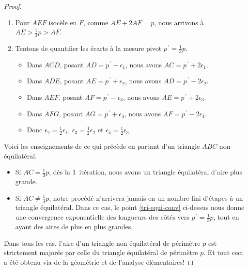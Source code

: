 \begin{proof}
\begin{enumerate}
		\item Pour $AEF$ isocèle en $F$, comme $AE + 2AF = p$, nous arrivons à  $AE > \frac13 p > AF$.
		
		
		\item \label{tri-equi-conv}
		Tentons de quantifier les écarts à la mesure pivot $p^{\,\prime} = \frac13 p$. 
		\begin{itemize}
			\item Dans $ACD$, posant $AD = p^{\,\prime} - \epsilon_1$, nous avons $AC = p^{\,\prime} + 2 \epsilon_1$.

			\item Dans $ADE$, posant $AE = p^{\,\prime} + \epsilon_2$, nous avons $AD = p^{\,\prime} - 2 \epsilon_2$.

			\item Dans $AEF$, posant $AF = p^{\,\prime} - \epsilon_3$, nous avons $AE = p^{\,\prime} + 2 \epsilon_3$.

			\item Dans $AFG$, posant $AG = p^{\,\prime} + \epsilon_4$, nous avons $AF = p^{\,\prime} - 2 \epsilon_4$.

			\item Donc
			$\epsilon_2 = \frac12 \epsilon_1$,
			$\epsilon_3 = \frac12 \epsilon_2$
			et
			$\epsilon_4 = \frac12 \epsilon_3$.
		\end{itemize}
	\end{enumerate}


	\smallskip
	
	Voici les enseignements de ce qui précède en partant d'un triangle $ABC$ non équilatéral.
	\begin{itemize}
		\item Si $AC = \frac13p$, dès la 1\iere\ itération, nous avons un triangle équilatéral d'aire plus grande.
		
		
		\item Si $AC \neq \frac13p$, notre procédé n'arrivera jamais en un nombre fini d'étapes à un triangle équilatéral.
		Dans ce cas, le point \ref{tri-equi-conv} ci-dessus nous donne une convergence exponentielle des longueurs des côtés vers $p^{\,\prime} = \frac13 p$, tout en ayant des aires de plus en plus grandes.
	\end{itemize}
	
	Dans tous les cas, l'aire d'un triangle non équilatéral de périmètre $p$ est strictement majorée par celle du triangle équilatéral de périmètre $p$. Et tout ceci a été obtenu via de la géométrie et de l'analyse élémentaires!
\end{proof}
